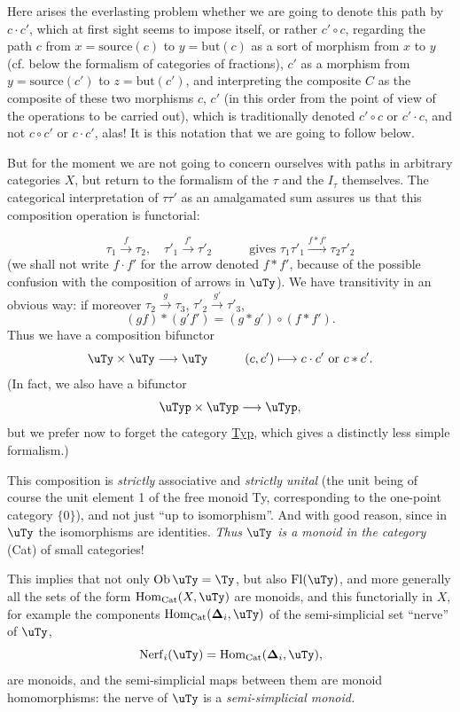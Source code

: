 Here arises the everlasting problem whether we are going to denote this path by $c{\cdot}c'$, which at first sight seems to impose itself, or rather $c' \circ c$, regarding the path $c$ from $x = \mathrm{source}(c)$ to $y = \mathrm{but}(c)$ as a sort of morphism from $x$ to $y$ (cf. below the formalism of categories of fractions), $c'$ as a morphism from $y = \mathrm{source}(c')$ to $z = \mathrm{but}(c')$, and interpreting the composite $C$ as the composite of these two morphisms $c$, $c'$ (in this order from the point of view of the operations to be carried out), which is traditionally denoted $c' \circ c$ or $c' \cdot c$, and not $c \circ c'$ or $c \cdot c'$, alas! It is this notation that we are going to follow below. %

But for the moment we are not going to concern ourselves with paths in arbitrary categories $X$, but return to the formalism of the $\tau$ and the $I_\tau$ themselves. The categorical interpretation of $\tau\tau'$ as an amalgamated sum assures us that this composition operation is functorial:

\[
\tau_1 \xrightarrow{\ f\ } \tau_2, \quad \tau'_1 \xrightarrow{\ f'\ } \tau'_2 \qquad\quad \text{gives } \tau_1\tau'_1 \xrightarrow{f*f'} \tau_2\tau'_2
\]
(we shall not write $f \cdot f'$ for the arrow denoted $f * f'$, because of the possible confusion with the composition of arrows in $\uTy$). We have transitivity in an obvious way: if moreover $\tau_2 \xrightarrow{\ g\ } \tau_3$, $\tau'_2 \xrightarrow{\ g'\ } \tau'_3$, 
\[
(gf) * (g'f') = (g * g') \circ (f * f').
\]
Thus we have a composition bifunctor
\[
\uTy \times \uTy \longrightarrow \uTy \qquad\quad (c,c') \longmapsto c \cdot c' \text{ or } c * c'.
\]
(In fact, we also have a bifunctor
\[
\uTyp \times \uTyp \longrightarrow \uTyp,
\]
but we prefer now to forget the category \underline{Typ}, which gives a distinctly less simple formalism.)

This composition is \textit{strictly} associative and \textit{strictly unital} (the unit being of course the unit element 1 of the free monoid Ty, corresponding to the one-point category $\{0\}$), and not just ``up to isomorphism''. And with good reason, since in $\uTy$ the isomorphisms are identities. \textit{Thus} $\uTy$ \textit{is a monoid in the category} (Cat) of small categories!

This implies that not only $\mathrm{Ob}\,\uTy = \Ty$, but also $\mathrm{Fl}(\uTy)$, and more generally all the sets of the form $\mathrm{Hom}_{\mathrm{Cat}}(X, \uTy)$ are monoids, and this functorially in $X$, for example the components $\mathrm{Hom}_{\mathrm{Cat}}(\boldsymbol{\Delta}_i, \uTy)$ of the semi-simplicial set ``nerve'' of $\uTy$,
\[
\mathrm{Nerf}_i(\uTy) = \mathrm{Hom}_{\mathrm{Cat}}(\boldsymbol{\Delta}_i, \uTy),
\]
are monoids, and the semi-simplicial maps between them are monoid homomorphisms: the nerve of $\uTy$ is a \textit{semi-simplicial monoid.}